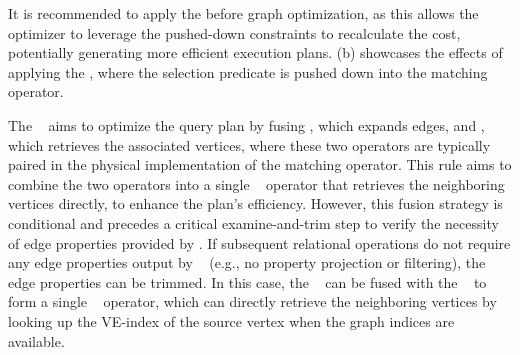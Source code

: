It is recommended to apply the \filterrule before graph optimization, as this allows the optimizer to leverage the pushed-down constraints to recalculate the cost, potentially generating more efficient execution plans. (b) showcases the effects of applying the \filterrule, where the selection predicate  is pushed down into the matching operator.

The \joinfuserule~ aims to optimize the query plan by fusing \expandedge, which expands edges, and \getvertex, which retrieves the associated vertices, where these two operators are typically paired in the physical implementation of the matching operator. This rule aims to combine the two operators into a single \expand~ operator that retrieves the neighboring vertices directly, to enhance the plan's efficiency.
However, this fusion strategy is conditional and precedes a critical examine-and-trim step to verify the necessity of edge properties provided by \expandedge.
If subsequent relational operations do not require any edge properties output by \getvertex~ (e.g., no property projection or filtering), the edge properties can be trimmed.
In this case, the \expandedge~ can be fused with the \getvertex~ to form a single \expand~ operator, which can directly retrieve the neighboring vertices by looking up the VE-index of the source vertex when the graph indices are available.
%

